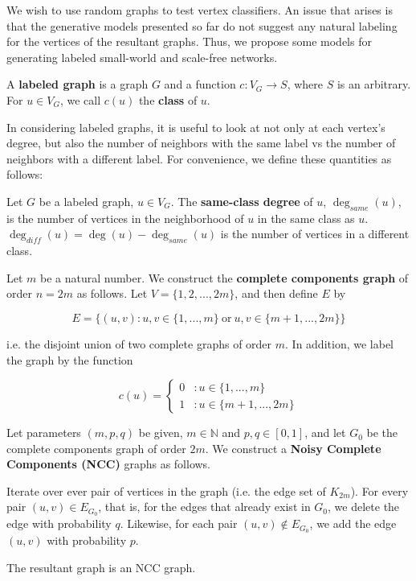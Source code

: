 We wish to use random graphs to test vertex classifiers. An issue that arises is that the generative
models presented so far do not suggest any natural labeling for the vertices of the resultant graphs.
Thus, we propose some models for generating labeled small-world and scale-free networks.

\begin{definition}
  A \textbf{labeled graph} is a graph $G$ and a function $c : V_G \to S$, where $S$ is an arbitrary.
  For $u \in V_G$, we call $c(u)$ the \textbf{class} of $u$.
\end{definition}

In considering labeled graphs, it is useful to look at not only at each vertex's degree, but also the
number of neighbors with the same label vs the number of neighbors with a different label. For
convenience, we define these quantities as follows:

\begin{definition}
  Let $G$ be a labeled graph, $u \in V_G$. The \textbf{same-class degree} of $u$, $\deg_{same}(u)$, is
  the number of vertices in the neighborhood of $u$ in the same class as $u$. $\deg_{diff}(u) =
  \deg(u) - \deg_{same}(u)$ is the number of vertices in a different class.
\end{definition}


\begin{definition}
  Let $m$ be a natural number. We construct the \textbf{complete components
    graph} of order $n = 2m$ as follows. Let $V = \{1,2, ..., 2m\}$, and then define
  $E$ by

  \[
    E = \{ (u,v) : u,v \in \{1,...,m\} ~\text{or}~ u,v \in \{m+1,...,2m\} \}
  \]

  i.e. the disjoint union of two complete graphs of order $m$. In addition, we label the graph by the
  function

  \[c(u) =
      \begin{cases}
        0 &: u \in \{1,...,m\} \\
        1 &: u \in \{m+1,...,2m\}
      \end{cases}
    \]
\end{definition}

\begin{definition}
  \label{def:ncc}
  Let parameters $(m,p,q)$ be given, $m \in \mathbb{N}$ and $p,q \in [0,1]$, and let $G_0$ be the
  complete components graph of order $2m$. We construct a \textbf{Noisy Complete Components (NCC)}
  graphs as follows.

  Iterate over ever pair of vertices in the graph (i.e. the edge set of
  $K_{2m}$). For every pair $(u,v) \in E_{G_0}$, that is, for the edges that
  already exist in $G_0$, we delete the edge with probability $q$. Likewise, for
  each pair $(u,v) \notin E_{G_0}$, we add the edge $(u,v)$ with probability
  $p$.

  The resultant graph is an NCC graph.
\end{definition}

